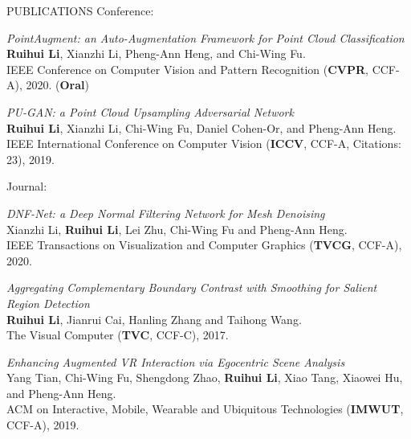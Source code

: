 \documentclass[UTF8]{cv} %
\begin{document}
\begin{rSection}{PUBLICATIONS}
\hspace{-7mm} Conference:

\begin{etaremune}[itemindent=0.00em]
    \renewcommand\labelenumi{[C\theenumi]}
    \item  \emph{PointAugment: an Auto-Augmentation Framework for Point Cloud Classification}
\\    \textbf{Ruihui Li}, Xianzhi Li, Pheng-Ann Heng, and Chi-Wing Fu.
\\    IEEE Conference on Computer Vision and Pattern Recognition (\textbf{CVPR}, CCF-A), 2020. (\textbf{Oral})
    \item  \emph{PU-GAN: a Point Cloud Upsampling Adversarial Network}
\\    \textbf{Ruihui Li}, Xianzhi Li, Chi-Wing Fu, Daniel Cohen-Or, and Pheng-Ann Heng.
\\    IEEE International Conference on Computer Vision (\textbf{ICCV}, CCF-A, Citations: 23), 2019.
 
\end{etaremune}


\hspace{-7mm} Journal:

\begin{etaremune}[itemindent=0.00em]
    \renewcommand\labelenumi{[J\theenumi]}
    \item  \emph{DNF-Net: a Deep Normal Filtering Network for Mesh Denoising}
\\    Xianzhi Li, \textbf{Ruihui Li}, Lei Zhu, Chi-Wing Fu and Pheng-Ann Heng.
\\    IEEE Transactions on Visualization and Computer Graphics  (\textbf{TVCG}, CCF-A), 2020.
    \item  \emph{Aggregating Complementary Boundary Contrast with Smoothing for Salient Region Detection}
\\    \textbf{Ruihui Li}, Jianrui Cai, Hanling Zhang and Taihong Wang.
\\    The Visual Computer (\textbf{TVC}, CCF-C), 2017.
    \item \emph{Enhancing Augmented VR Interaction via Egocentric Scene Analysis}
\\  Yang Tian, Chi-Wing Fu, Shengdong Zhao, \textbf{Ruihui Li}, Xiao Tang, Xiaowei Hu, and Pheng-Ann Heng.
\\ACM on Interactive, Mobile, Wearable and Ubiquitous Technologies (\textbf{IMWUT}, CCF-A), 2019.
\end{etaremune}


\end{rSection}
\end{document}
